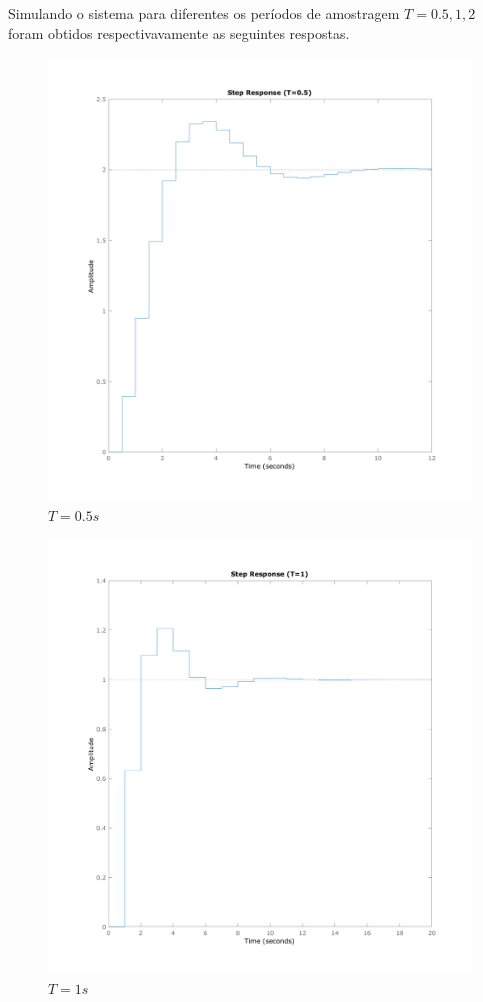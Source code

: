 \documentclass[a4paper,11pt]{article}
\begin{document}
Simulando o sistema para diferentes os períodos de amostragem $T={0.5,1,2}$ foram obtidos respectivavamente as seguintes respostas.

\begin{figure}[H]
    \centering
    \includegraphics[width=0.8\linewidth]{img/exsim3-step-t500ms.png}
    \caption{ $T=0.5s$}
\end{figure}

\begin{figure}[H]
    \centering
    \includegraphics[width=0.8\linewidth]{img/exsim3-step-t1000ms.png}
    \caption{ $T=1s$}
\end{figure}
\end{document}
